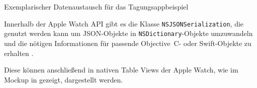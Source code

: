\begin{listing}[htb]
    
    \caption{Exemplarischer Datenaustausch für das Tagungsappbeispiel}
    \label{lst:watchCommunicationExample}
\end{listing}

Innerhalb der Apple Watch API gibt es die Klasse \texttt{NSJSONSerialization}, die genutzt werden kann um JSON-Objekte in \texttt{NSDictionary}-Objekte umzuwandeln und die nötigen Informationen für passende Objective~C- oder Swift-Objekte zu erhalten \cite{appleDokuJSONSerialization}. 

Diese können anschließend in nativen Table Views der Apple Watch, wie im Mockup in  gezeigt, dargestellt werden.

